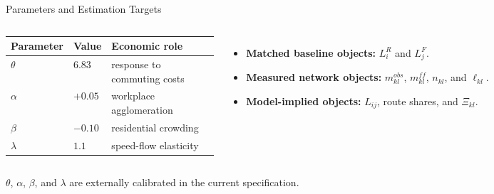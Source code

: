 \documentclass[11pt,aspectratio=169]{beamer}
\newcommand{\app}[1]{\allowbreak\hspace{0.25em}\hyperlink{#1}{\beamergotobutton{details}}}
\begin{document}
\begin{frame}[label=estparams]{Parameters and Estimation Targets}
\small
\begin{columns}[T,onlytextwidth]
\scriptsize
\begin{tabularx}{\linewidth}{@{}p{0.18\linewidth}p{0.16\linewidth}X@{}}
\toprule
Parameter & Value & Economic role \\
\midrule
$\theta$ & $6.83$ & response to commuting costs \\
$\alpha$ & $+0.05$ & workplace agglomeration \\
$\beta$ & $-0.10$ & residential crowding \\
$\lambda$ & $1.1$ & speed-flow elasticity \\
\bottomrule
\end{tabularx}
\begin{itemize}\footnotesize
  \item \textbf{Matched baseline objects:} $L_i^R$ and $L_j^F$.
  \item \textbf{Measured network objects:} $m_{kl}^{obs}$, $m_{kl}^{ff}$, $n_{kl}$, and $\ell_{kl}$.
  \item \textbf{Model-implied objects:} $L_{ij}$, route shares, and $\Xi_{kl}$.
\end{itemize}
\end{columns}
\vspace{0.45em}
{\footnotesize $\theta$, $\alpha$, $\beta$, and $\lambda$ are externally calibrated in the current specification. \app{appparams}}
\end{frame}
\end{document}
